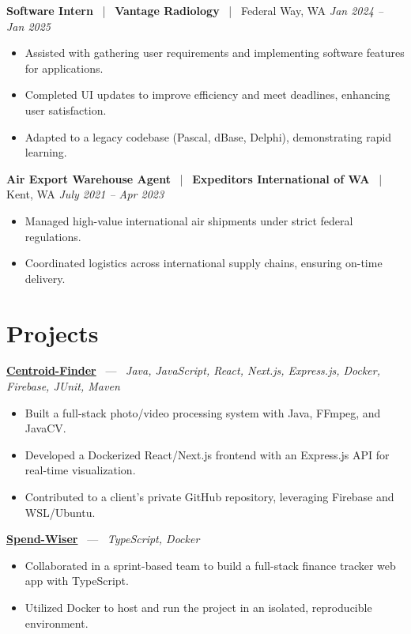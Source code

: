 \documentclass[10pt, letterpaper]{article}
\newcommand{\jobhead}[4]{%
  \vspace{5pt}%
  {\bfseries\color{dark}#1}%
  ~{\color{light}|}~%
  {\bfseries\color{navy}#2}%
  ~{\color{light}|}~%
  {\color{light}#3}%
  \hfill{\color{light}\small\textit{#4}}\\[-2pt]%
}
\newcommand{\projhead}[3]{%
  \vspace{5pt}%
  {\bfseries\color{dark}\href{#2}{#1}}%
  ~{\color{light}---}~%
  {\color{light}\small\textit{#3}}\\[-2pt]%
}
\begin{document}
\jobhead{Software Intern}{Vantage Radiology}{Federal Way, WA}{Jan 2024 – Jan 2025}
\begin{itemize}
  \item Assisted with gathering user requirements and implementing software features for applications.
  \item Completed UI updates to improve efficiency and meet deadlines, enhancing user satisfaction.
  \item Adapted to a legacy codebase (Pascal, dBase, Delphi), demonstrating rapid learning.
\end{itemize}

\jobhead{Air Export Warehouse Agent}{Expeditors International of WA}{Kent, WA}{July 2021 – Apr 2023}
\begin{itemize}
  \item Managed high-value international air shipments under strict federal regulations.
  \item Coordinated logistics across international supply chains, ensuring on-time delivery.
\end{itemize}

\section{Projects}

\projhead{Centroid-Finder}{https://github.com/xavierb117/centroid-finder}{Java, JavaScript, React, Next.js, Express.js, Docker, Firebase, JUnit, Maven}
\begin{itemize}
  \item Built a full-stack photo/video processing system with Java, FFmpeg, and JavaCV.
  \item Developed a Dockerized React/Next.js frontend with an Express.js API for real-time visualization.
  \item Contributed to a client's private GitHub repository, leveraging Firebase and WSL/Ubuntu.
\end{itemize}

\projhead{Spend-Wiser}{https://github.com/JesseChum/w26-sdev372-spendwiser-finance-tracker}{TypeScript, Docker}
\begin{itemize}
  \item Collaborated in a sprint-based team to build a full-stack finance tracker web app with TypeScript.
  \item Utilized Docker to host and run the project in an isolated, reproducible environment.
\end{itemize}
\end{document}
